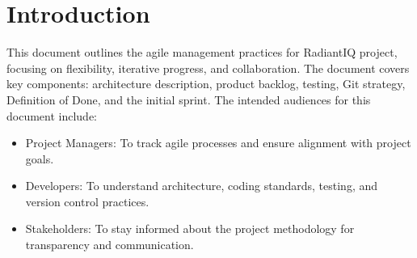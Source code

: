 \section{Introduction} \label{introduction}

This document outlines the agile management practices for RadiantIQ project, focusing on flexibility, iterative progress, and collaboration. The document covers key components: architecture description, product backlog, testing, Git strategy, Definition of Done, and the initial sprint. The intended audiences for this document include:

\begin{itemize}
    \item Project Managers: To track agile processes and ensure alignment with project goals.
    \item Developers: To understand architecture, coding standards, testing, and version control practices.
    \item Stakeholders: To stay informed about the project methodology for transparency and communication.
\end{itemize}
